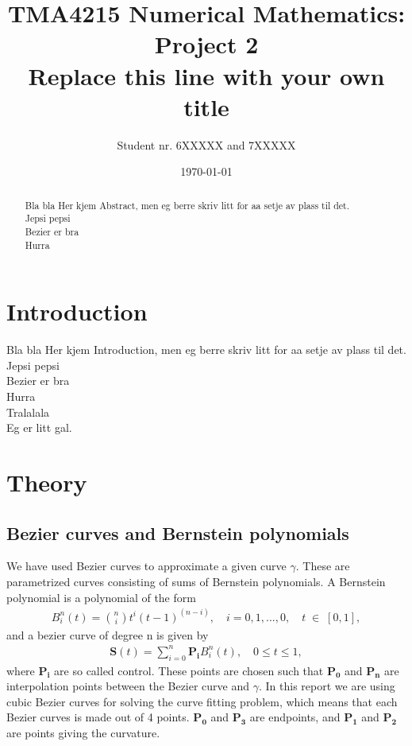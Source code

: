\documentclass[10pt]{article}
\title{TMA4215 Numerical Mathematics: Project 2 \\ Replace this line with your own title}
\author{Student nr. 6XXXXX and 7XXXXX} %
\date{\today}
\begin{document}
\maketitle
\begin{abstract}

Bla bla Her kjem Abstract, men eg berre skriv litt for aa setje av plass til det. \\
Jepsi pepsi \\
Bezier er bra \\
Hurra \\

\end{abstract}

\section{Introduction} 

Bla bla Her kjem Introduction, men eg berre skriv litt for aa setje av plass til det. \\
Jepsi pepsi \\
Bezier er bra \\
Hurra \\
Tralalala \\
Eg er litt gal. \\

\section{Theory}

\subsection*{Bezier curves and Bernstein polynomials}

We have used Bezier curves to approximate a given curve $\gamma$. These are parametrized curves consisting of sums of Bernstein polynomials. A Bernstein polynomial is a polynomial of the form
\begin{align}
B_{i}^n(t) = \binom{n}{i}t^i(t-1)^{(n-i)},\quad i = 0, 1, ..., 0,\quad t \; \in \; [0,1],
\end{align}
and a bezier curve of degree n is given by
\begin{align}
\mathbf{S}(t) = \sum_{i=0}^{n} \mathbf{P_i} B_{i}^n(t), \quad 0 \leq t \leq 1,
\end{align}
where $\mathbf{P_i}$ are so called control. These points are chosen such that $\mathbf{P_0}$ and $\mathbf{P_n}$ are interpolation points between the Bezier curve and $\gamma$. In this report we are using cubic Bezier curves for solving the curve fitting problem, which means that each Bezier curves is made out of 4 points. $\mathbf{P_0}$ and $\mathbf{P_3}$ are endpoints, and $\mathbf{P_1}$ and $\mathbf{P_2}$ are points giving the curvature.
\end{document}
